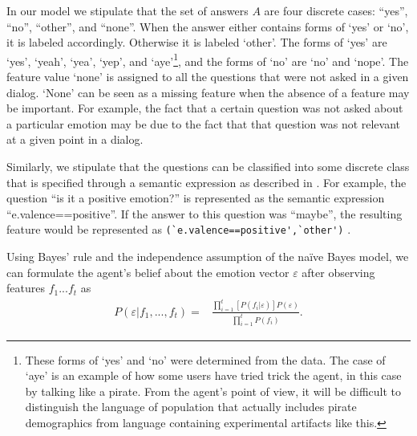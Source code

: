 \documentclass[a4paper]{article}
\begin{document}
In our model we stipulate that the set of answers $A$ are four discrete cases:
``yes'', ``no'', ``other'', and ``none''.  When the answer either contains
forms of `yes' or `no', it is labeled accordingly.  Otherwise it is labeled
`other'.  The forms of `yes' are `yes', `yeah', `yea', `yep', and
`aye'\footnote{These forms of `yes' and `no' were determined from the data.
  The case of `aye' is an example of how some users have tried trick the
  agent, in this case by talking like a pirate.  From the agent's point of
  view, it will be difficult to distinguish the language of population that
  actually includes pirate demographics from language containing experimental
  artifacts like this.  }, and the forms of `no' are `no' and `nope'. The
feature value `none' is assigned to all the questions that were not asked in a
given dialog.  `None' can be seen as a missing feature when the absence of a
feature may be important.  For example, the fact that a certain question was
not asked about a particular emotion may be due to the fact that that question
was not relevant at a given point in a dialog.





Similarly, we stipulate that the questions can be classified into some
discrete class that is specified through a semantic expression as described in
\cite{Kazemzadeh2011a}.  For example, the question ``is it a positive
emotion?'' is represented as the semantic expression ``e.valence==positive''.
If the answer to this question was ``maybe'', the resulting feature would be
represented as {\small \verb#(`e.valence==positive',`other')# }.  

Using Bayes' rule and the independence assumption of the na\"{i}ve Bayes model,
we can formulate the agent's belief about the emotion vector $\varepsilon$
after observing features $f_1 ... f_t$ as
\begin{equation}
\label{naivebayes}
\begin{split}
  P(\varepsilon|f_1,...,f_t) =  &\frac{  \prod_{i=1}^t \left[ P( f_i|\varepsilon) \right]  P(\varepsilon)}{\prod_{i=1}^t P(f_i)} .
\end{split}
\end{equation}
\end{document}
